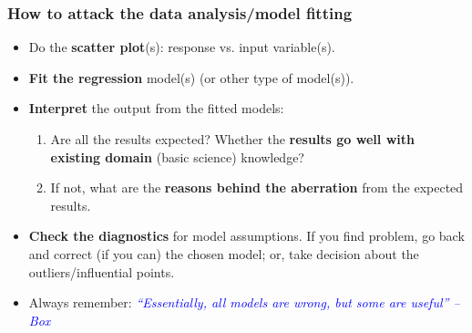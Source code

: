 \documentclass[10pt]{beamer} %
\begin{document}
\begin{frame}
   \frametitle{How to attack the data analysis/model fitting}
   \begin{itemize}
      \item Do the \textbf{scatter plot}(s): response vs. input variable(s).
         \vspace{0.2cm}
      \item \textbf{Fit the regression} model(s) (or other type of model(s)).
         \vspace{0.2cm}
      \item \textbf{Interpret} the output from the fitted models:
         \vspace{0.2cm}
         \begin{enumerate}
            \item Are all the results expected? Whether the \textbf{results go
               well with existing domain} (basic science) knowledge?
               \vspace{0.2cm}	
            \item If not, what are the \textbf{reasons behind the aberration} from the expected results.  
         \end{enumerate}
      \item \textbf{Check the diagnostics} for model assumptions. If you find
         problem, go back and correct (if you can) the chosen model; or, take
         decision about the outliers/influential points. 
         \vspace{0.2cm}
      \item Always remember: 	\emph{\textcolor{blue}{``Essentially, all models
         are wrong, but some are useful'' -- Box}}
   \end{itemize}	
\end{frame}
\end{document}
